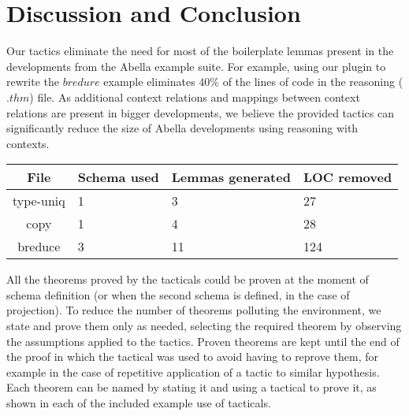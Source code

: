 \documentclass[nocopyrightspace,authoryear]{sigplanconf}
\begin{document}
\begin{comment}
1:
The $i$th context relations \lstinline|S| can be used as the $j$th projection of a context relations \lstinline|S'| if, for each clauses \lstinline|C| of \lstinline|S|, there exists a clause \lstinline|C'| of \lstinline|S'| s.t. the $i$th formula of \lstinline|C| matches the $j$th formula of \lstinline|C'|, which is to say that the $j$th projection of the schema \lstinline|S'| is more general than the $i$th projection schema \lstinline|S| .
\end{comment}


\section{Discussion and Conclusion}
Our tactics eliminate the need for most of the boilerplate lemmas present in the developments from the Abella example suite. For example, using our plugin to rewrite the $bredure$ example eliminates $40\%$ of the lines of code in the reasoning ($.thm$) file. As additional context relations and mappings between context relations are present in bigger developments, we believe the provided tactics can significantly reduce the size of Abella developments using reasoning with contexts.


\begin{center}
\begin{tabular} { | c || p{1.5cm} | p{1.5cm} | p{1.5cm} |}
\hline
File & Schema used & Lemmas generated & LOC removed \\ \hline
type-uniq & 1 & 3 & 27  \\ \hline
copy & 1 & 4 & 28 \\ \hline
breduce & 3 & 11 & 124 \\ \hline

\end{tabular}
\end{center}

All the theorems proved by the tacticals could be proven at the moment of schema definition (or when the second schema is defined, in the case of projection). To reduce the number of theorems polluting the environment, we state and prove them only as needed, selecting the required theorem by observing the assumptions applied to the tactics. Proven theorems are kept until the end of the proof in which the tactical was used to avoid having to reprove them, for example in the case of repetitive application of a tactic to similar hypothesis. Each theorem can be named by stating it and using a tactical to prove it, as shown in each of the included example use of tacticals.
\end{document}
